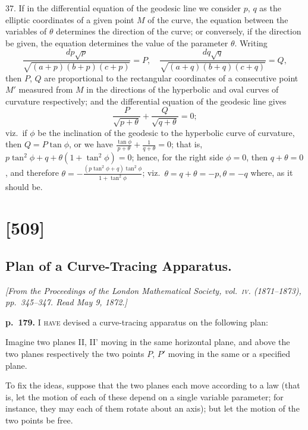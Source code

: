 \documentclass[11pt,a4paper]{article}
\begin{document}
37. If in the differential equation of the geodesic line we consider $p$, $q$ as the elliptic coordinates of a given point $M$ of the curve, the equation between the variables of $\theta$ determines the direction of the curve; or conversely, if the direction be given, the equation determines the value of the parameter $\theta$.  Writing
\[
\frac{dp \sqrt{p}}{\sqrt{(a + p)(b + p)(c + p)}} = P, \quad \frac{dq \sqrt{q}}{\sqrt{(a + q)(b + q)(c + q)}} = Q,
\]
then $P$, $Q$ are proportional to the rectangular coordinates of a consecutive point $M'$ measured from $M$ in the directions of the hyperbolic and oval curves of curvature respectively; and the differential equation of the geodesic line gives
\[
\frac{P}{\sqrt{p + \theta}} + \frac{Q}{\sqrt{q + \theta}} = 0;
\]
viz.\ if $\phi$ be the inclination of the geodesic to the hyperbolic curve of curvature, then $Q = P \tan \phi$, or we have $\frac{\tan \phi}{p + \theta} + \frac{1}{q + \theta} = 0$; that is, $p \tan^2 \phi + q + \theta (1 + \tan^2 \phi) = 0$; hence, for the right side $\phi = 0$, then $q + \theta = 0$, and therefore $\theta = -\frac{(p \tan^2 \phi + q) \tan^2 \phi}{1 + \tan^2 \phi}$; viz.\ $\theta = q + \theta = -p, \theta = -q$ where, as it should be.

\clearpage

\section{[509]}
\subsection{Plan of a Curve-Tracing Apparatus.}

\begin{center}
\textit{[From the Proceedings of the London Mathematical Society, vol.\ \textsc{iv}. (1871--1873),
pp.\ 345--347.  Read May 9, 1872.]}
\end{center}

\noindent
\textbf{p.~179.}  \textsc{I have} devised a curve-tracing apparatus on the following plan:

Imagine two planes II, II' moving in the same horizontal plane, and above the
two planes respectively the two points $P$, $P'$ moving in the same or a specified plane.

To fix the ideas, suppose that the two planes each move according to a law (that
is, let the motion of each of these depend on a single variable parameter; for instance,
they may each of them rotate about an axis); but let the motion of the two points be
free.
\end{document}
